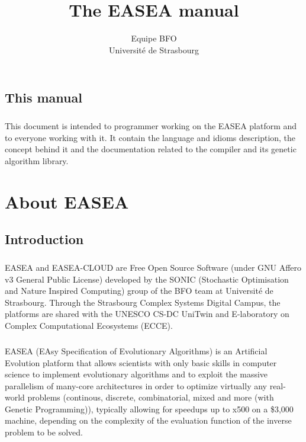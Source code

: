 \documentclass{book}
\begin{document}
\title{The EASEA manual}
\author{Equipe BFO \\
  \small Université de Strasbourg}
\maketitle


\setcounter{tocdepth}{1}
\tableofcontents
\section{This manual} %
\label{sec:introduction}
  \paragraph{} %
  \label{par:}

  This document is intended to programmer working on the EASEA platform and to
  everyone working with it. It contain the language and idioms description, the
  concept behind it and the documentation related to the compiler and its genetic
  algorithm library.
\chapter{About EASEA}
\section{Introduction} %
\label{sec:Introduction}
\paragraph{} %
\label{par:}

EASEA and EASEA-CLOUD are Free Open Source Software (under GNU Affero v3 General Public License) developed by the SONIC (Stochastic Optimisation and Nature Inspired Computing) group of the BFO team at Université de Strasbourg. Through the Strasbourg Complex Systems Digital Campus, the platforms are shared with the UNESCO CS-DC UniTwin and E-laboratory on Complex Computational Ecosystems (ECCE).
\paragraph{} %
\label{par:}
  
EASEA (EAsy Specification of Evolutionary Algorithms) is an Artificial Evolution
platform that allows scientists with only basic skills in computer science to
implement evolutionary algorithms and to exploit the massive parallelism of
many-core architectures in order to optimize virtually any real-world problems
(continous, discrete, combinatorial, mixed and more (with Genetic Programming)),
typically allowing for speedups up to x500 on a \$3,000 machine, depending on the complexity of the evaluation function of the inverse problem to be solved.
\end{document}
